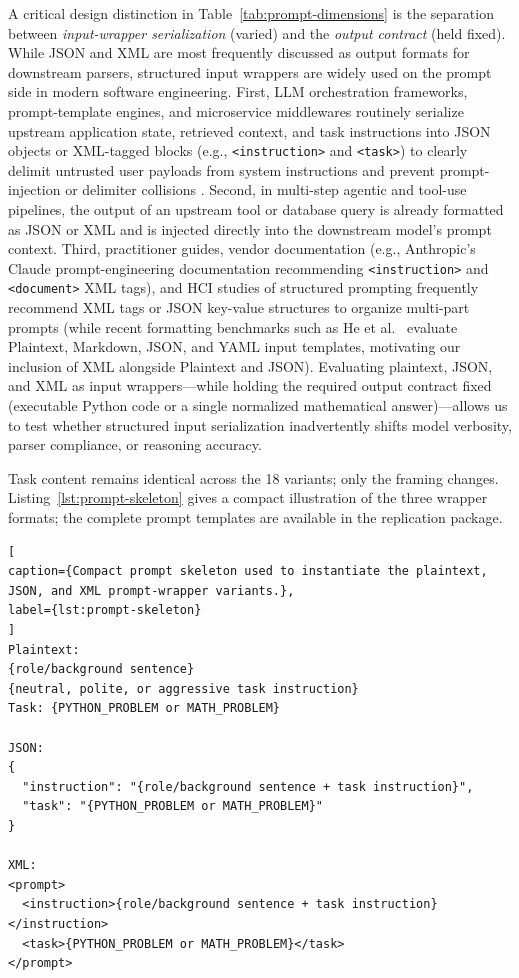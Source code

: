 \documentclass[a4paper,fleqn]{cas-sc}
\begin{document}
A critical design distinction in Table~\ref{tab:prompt-dimensions} is the separation between \emph{input-wrapper serialization} (varied) and the \emph{output contract} (held fixed). While JSON and XML are most frequently discussed as output formats for downstream parsers, structured input wrappers are widely used on the prompt side in modern software engineering. First, LLM orchestration frameworks, prompt-template engines, and microservice middlewares routinely serialize upstream application state, retrieved context, and task instructions into JSON objects or XML-tagged blocks (e.g., \texttt{<instruction>} and \texttt{<task>}) to clearly delimit untrusted user payloads from system instructions and prevent prompt-injection or delimiter collisions \citep{schulhoff2024promptreport, liu2024structuredoutput}. Second, in multi-step agentic and tool-use pipelines, the output of an upstream tool or database query is already formatted as JSON or XML and is injected directly into the downstream model's prompt context. Third, practitioner guides, vendor documentation (e.g., Anthropic's Claude prompt-engineering documentation recommending \texttt{<instruction>} and \texttt{<document>} XML tags), and HCI studies of structured prompting \citep{liu2024structuredoutput, schulhoff2024promptreport} frequently recommend XML tags or JSON key-value structures to organize multi-part prompts (while recent formatting benchmarks such as He et al.\ \citep{he2024formatting} evaluate Plaintext, Markdown, JSON, and YAML input templates, motivating our inclusion of XML alongside Plaintext and JSON). Evaluating plaintext, JSON, and XML as input wrappers—while holding the required output contract fixed (executable Python code or a single normalized mathematical answer)—allows us to test whether structured input serialization inadvertently shifts model verbosity, parser compliance, or reasoning accuracy.

Task content remains identical across the 18 variants; only the framing changes. Listing~\ref{lst:prompt-skeleton} gives a compact illustration of the three wrapper formats; the complete prompt templates are available in the replication package.

\begin{lstlisting}[
caption={Compact prompt skeleton used to instantiate the plaintext, JSON, and XML prompt-wrapper variants.},
label={lst:prompt-skeleton}
]
Plaintext:
{role/background sentence}
{neutral, polite, or aggressive task instruction}
Task: {PYTHON_PROBLEM or MATH_PROBLEM}

JSON:
{
  "instruction": "{role/background sentence + task instruction}",
  "task": "{PYTHON_PROBLEM or MATH_PROBLEM}"
}

XML:
<prompt>
  <instruction>{role/background sentence + task instruction}</instruction>
  <task>{PYTHON_PROBLEM or MATH_PROBLEM}</task>
</prompt>
\end{lstlisting}
\end{document}
